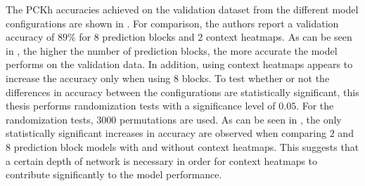 The PCKh accuracies achieved on the validation dataset from the different model configurations are shown in .
For comparison, the authors report a validation accuracy of $89\%$ for $8$ prediction blocks and $2$ context heatmaps. 
As can be seen in , the higher the number of prediction blocks, the more accurate the model performs on the validation data.
In addition, using context heatmaps appears to increase the accuracy only when using $8$ blocks.
To test whether or not the differences in accuracy between the configurations are statistically significant, this thesis performs randomization tests with a significance level of $0.05$.
For the randomization tests, $3000$ permutations are used.
As can be seen in , the only statistically significant increases in accuracy are observed when comparing $2$ and $8$ prediction block models with and without context heatmaps.
This suggests that a certain depth of network is necessary in order for context heatmaps to contribute significantly to the model performance.
 
\begin{table}[]
    \centering
    \caption{PCKh test results of our recreation in direct comparison to the original work by \cite{luvizon_2d/3d_2018} using $\alpha = 0.5$. The change in total accuracy is statistically significant with a significance level of $0.05$. }
    \label{tab:mpii_test}
\end{table}

